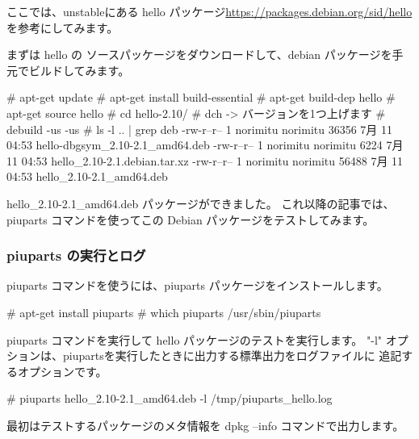 \documentclass[mingoth,a4paper]{jsarticle}
\begin{document}
ここでは、unstableにある hello パッケージ\url{https://packages.debian.org/sid/hello} を参考にしてみます。

まずは hello の ソースパッケージをダウンロードして、debian パッケージを手元でビルドしてみます。

\begin{commandline}
# apt-get update
# apt-get install build-essential
# apt-get build-dep hello
# apt-get source hello
# cd hello-2.10/
# dch
  -> バージョンを1つ上げます
# debuild -us -us
# ls -l .. | grep deb
-rw-r--r--  1 norimitu norimitu  36356  7月 11 04:53 hello-dbgsym_2.10-2.1_amd64.deb
-rw-r--r--  1 norimitu norimitu   6224  7月 11 04:53 hello_2.10-2.1.debian.tar.xz
-rw-r--r--  1 norimitu norimitu  56488  7月 11 04:53 hello_2.10-2.1_amd64.deb
\end{commandline}

hello\_2.10-2.1\_amd64.deb パッケージができました。
これ以降の記事では、piuparts コマンドを使ってこの Debian パッケージをテストしてみます。


\subsubsection{piuparts の実行とログ}

piuparts コマンドを使うには、piuparts パッケージをインストールします。

\begin{commandline}
# apt-get install piuparts
# which piuparts
/usr/sbin/piuparts
\end{commandline}

piuparts コマンドを実行して hello パッケージのテストを実行します。
"-l" オプションは、piupartsを実行したときに出力する標準出力をログファイルに
追記するオプションです。

\begin{commandline}
# piuparts hello_2.10-2.1_amd64.deb -l /tmp/piuparts_hello.log
\end{commandline}

最初はテストするパッケージのメタ情報を dpkg --info コマンドで出力します。
\end{document}
